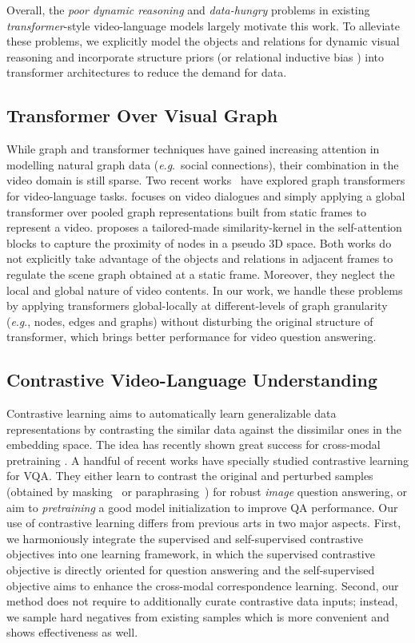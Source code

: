 \documentclass[10pt,journal,compsoc]{IEEEtran}
\newcommand{\trans}{\emph{transformer}}
\newcommand{\eg}{\textit{e}.\textit{g}.}
\begin{document}
Overall, the \emph{poor dynamic reasoning} and \emph{data-hungry} problems in existing \trans-style video-language models largely motivate this work. To alleviate these problems, we explicitly model the objects and relations for dynamic visual reasoning and incorporate structure priors (or relational inductive bias \cite{battaglia2018relational}) into transformer architectures to reduce the demand for data.

 
\subsection{Transformer Over Visual Graph}
While graph and transformer techniques have gained increasing attention \cite{kreuzer2021rethinking,wang2021tcl,ying2021transformers,yun2019graph} in modelling natural graph data (\eg~social connections), their combination in the video domain is still sparse.
Two recent works~\cite{cherian2022,geng2021dynamic} have explored graph transformers for video-language tasks. \cite{geng2021dynamic} focuses on video dialogues and simply applying a global transformer over pooled graph representations built from static frames to represent a video. \cite{cherian2022} proposes a tailored-made similarity-kernel in the self-attention blocks to capture the proximity of nodes in a pseudo 3D space. Both works do not explicitly take advantage of the objects and relations in adjacent frames to regulate the scene graph obtained at a static frame. Moreover, they neglect the local and global nature of video contents. In our work, we handle these problems by applying transformers global-locally at different-levels of graph granularity (\eg, nodes, edges and graphs) without disturbing the original structure of transformer, which brings better performance for video question answering.

\subsection{Contrastive Video-Language Understanding}
Contrastive learning aims to automatically learn generalizable data representations by contrasting the similar data against the dissimilar ones in the embedding space. The idea has recently shown great success for cross-modal pretraining \cite{miech2020end,kim2021self,radford2021learning,xu2021videoclip,yang2021just}. A handful of recent works have specially studied contrastive learning for VQA. They either learn to contrast the original and perturbed samples (obtained by masking~\cite{liang2020learning}
or paraphrasing~\cite{kant2021contrast}) for robust \emph{image} question answering, 
or aim to \emph{pretraining} a good model initialization to improve QA performance\cite{kim2021self,Yang_2021_ICCV}. 
Our use of contrastive learning differs from previous arts in two major aspects.  First, we harmoniously 
integrate the supervised and self-supervised contrastive objectives into one learning framework, in which the supervised contrastive objective is directly oriented for question answering and the self-supervised objective aims to enhance the cross-modal correspondence learning. Second, our method does not require to additionally curate contrastive data inputs; instead, we sample hard negatives from existing samples which is more convenient and shows effectiveness as well.
\end{document}
